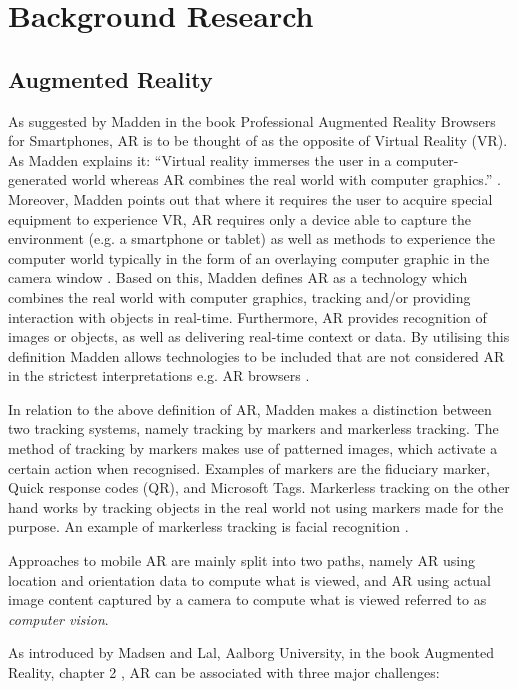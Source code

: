 \chapter{Background Research}\label{ch:backgroundresearch}
\section{Augmented Reality}
As suggested by Madden in the book Professional Augmented Reality Browsers for Smartphones, AR is to be thought of as the opposite of Virtual Reality (VR). As Madden explains it: “Virtual reality immerses the user in a computer-generated world whereas AR combines the real world with computer graphics.” \cite{Madden2011}. Moreover, Madden points out that where it requires the user to acquire special equipment to experience VR, AR requires only a device able to capture the environment (e.g. a smartphone or tablet) as well as methods to experience the computer world typically in the form of an overlaying computer graphic in the camera window \cite{Madden2011}. Based on this, Madden defines AR as a technology which combines the real world with computer graphics, tracking and/or providing interaction with objects in real-time. Furthermore, AR provides recognition of images or objects, as well as delivering real-time context or data. By utilising this definition Madden allows technologies to be included that are not considered AR in the strictest interpretations e.g. AR browsers \cite{Madden2011}.

In relation to the above definition of AR, Madden makes a distinction between two tracking systems, namely tracking by markers and markerless tracking. The method of tracking by markers makes use of patterned images, which activate a certain action when recognised. Examples of markers are the fiduciary marker, Quick response codes (QR), and Microsoft Tags. Markerless tracking on the other hand works by tracking objects in the real world not using markers made for the purpose. An example of markerless tracking is facial recognition \cite{Madden2011}.

Approaches to mobile AR are mainly split into two paths, namely AR using location and orientation data to compute what is viewed, and AR using actual image content captured by a camera to compute what is viewed referred to as \textit{computer vision}.

As introduced by Madsen and Lal, Aalborg University, in the book Augmented Reality, chapter 2 \cite{Lal2010}, AR can be associated with three major challenges:

